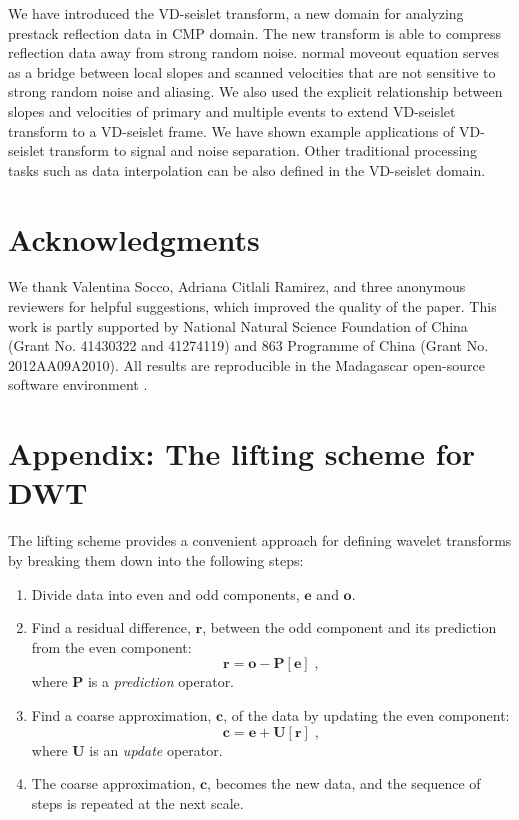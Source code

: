 We have introduced the VD-seislet transform, a new domain for
analyzing prestack reflection data in CMP domain. The new transform is
able to compress reflection data away from strong random
noise.   normal moveout
equation serves as a bridge between local slopes and scanned
velocities that are not sensitive to strong random noise and
aliasing. We also used the explicit relationship between slopes and
velocities of primary and multiple events to extend VD-seislet
transform to a VD-seislet frame. We have shown example applications of
VD-seislet transform to signal and noise separation. Other traditional
processing tasks such as data interpolation can be
also   defined in the VD-seislet domain.

\section{Acknowledgments}
We thank Valentina Socco, Adriana Citlali Ramirez, and three anonymous
reviewers for helpful suggestions, which improved the quality of the
paper. This work is partly supported by National Natural Science
Foundation of China (Grant No. 41430322 and 41274119) and 863
Programme of China (Grant No. 2012AA09A2010). All results are
reproducible in the Madagascar open-source software environment
\cite[]{m8r}.

\appendix
\section{Appendix: The lifting scheme for DWT}

The lifting scheme \cite[]{Sweldens95} provides a convenient approach
for defining wavelet transforms by breaking them down into the
following steps:
\begin{enumerate}
\item Divide data into even and odd components, $\mathbf{e}$ and
  $\mathbf{o}$.
\item Find a residual difference, $\mathbf{r}$, between the odd
  component and its prediction from the even component:
  \begin{equation}
    \label{eq:c}
    \mathbf{r}  = \mathbf{o} - \mathbf{P[e]}\;,
  \end{equation}
  where $\mathbf{P}$ is a \emph{prediction} operator.
\item Find a coarse approximation, $\mathbf{c}$, of the data by
  updating the even component:
  \begin{equation}
    \label{eq:r}
    \mathbf{c}  = \mathbf{e} + \mathbf{U[r]}\;,
  \end{equation}
  where $\mathbf{U}$ is an \emph{update} operator.
\item The coarse approximation, $\mathbf{c}$, becomes the new
  data, and the sequence of steps is repeated at the next scale.
\end{enumerate}

